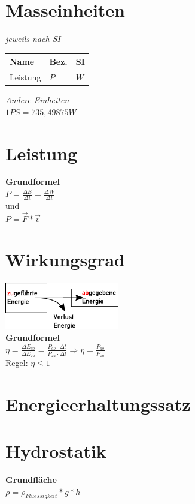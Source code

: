 \documentclass[a4paper,10pt]{article}
\begin{document}
\begin{multicols}{3}

  \section{Masseinheiten}
  \textit{jeweils nach SI}\\
  \begin{tabular}{|l|l|l|}
    \hline
    \textbf{Name} & \textbf{Bez.} & \textbf{SI} \\\hline
    Leistung & \(P\) & \(W\)\\\hline
  \end{tabular}

  \textit{Andere Einheiten}\\
  \(1 PS = 735,49875 W\)\\


  \section{Leistung}
  \textbf{Grundformel}\\
  \(P = \frac{\Delta E}{\Delta t} = \frac{\Delta W}{\Delta t} \)\\
  und\\
  \(P = \vec{F} * \vec{v}\)

  \section{Wirkungsgrad}
  \includegraphics[width=5cm]{wirkungsgrad}\\
  \textbf{Grundformel}\\
  \(\eta = \frac{{\Delta {E_{ab}}}}{{\Delta {E_{zu}}}} = \frac{{{P_{ab}} \cdot \Delta t}}{{{P_{zu}} \cdot \Delta t}} \Rightarrow \eta = \frac{{{P_{ab}}}}{{{P_{zu}}}}\)
  \\
  Regel: \(\eta \leq 1\)
  \section{Energieerhaltungssatz}

  \section{Hydrostatik}
  \textbf{Grundfläche}\\
  \(\rho = \rho_{Fluessigkeit} * g * h\)\\
\end{multicols}
\end{document}
